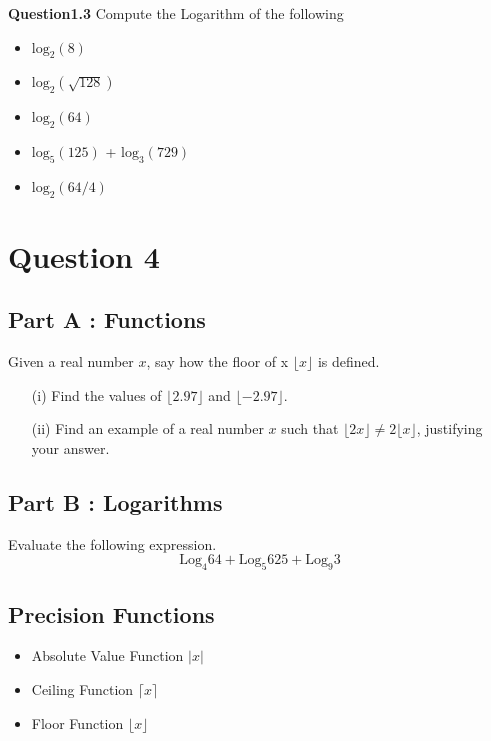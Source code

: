\documentclass{article}
\begin{document}
\noindent \textbf{Question1.3} Compute the Logarithm of the following
\begin{itemize}
	\item $\mbox{log}_2(8)$
	\item $\mbox{log}_2(\sqrt{128})$
	\item $\mbox{log}_2(64)$
	\item $\mbox{log}_5(125)$ +   $\mbox{log}_3(729)$
	\item $\mbox{log}_2(64/4)$
\end{itemize}




\section*{Question 4}

\subsection*{Part A : Functions}
Given a real number $x$, say how the floor of x  $\lfloor x \rfloor$ is defined.
\begin{itemize}
	\item[(i)] Find the values of $\lfloor 2.97 \rfloor$ and $\lfloor -2.97 \rfloor$.
	\item[(ii)] Find an example of a real number $x$ such that $\lfloor 2x \rfloor  \neq 2\lfloor x \rfloor$, justifying your answer.
\end{itemize}



\subsection*{Part B : Logarithms}
Evaluate the following expression.
\[ \mbox{Log}_4 64 + \mbox{Log}_5 625 + \mbox{Log}_9 3 \] 


\subsection{Precision Functions}

\begin{itemize}
	\item Absolute Value Function $| x |$
	\item Ceiling Function $\lceil x \rceil$
	\item Floor Function  $\lfloor x \rfloor $
\end{itemize}
\end{document}
